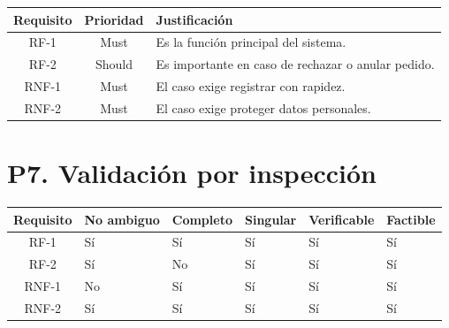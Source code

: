 \documentclass[12pt,a4paper]{article}
\begin{document}
\begin{center}
\small
\setlength{\tabcolsep}{5pt}
\begin{tabularx}{0.96\textwidth}{|c|c|X|}
\hline
\textbf{Requisito} & \textbf{Prioridad} & \textbf{Justificación} \\
\hline
RF-1 & Must & Es la función principal del sistema. \\
\hline
RF-2 & Should & Es importante en caso de rechazar o anular pedido. \\
\hline
RNF-1 & Must & El caso exige registrar con rapidez. \\
\hline
RNF-2 & Must & El caso exige proteger datos personales. \\
\hline
\end{tabularx}
\end{center}

\section*{P7. Validación por inspección}

\begin{center}
\small
\setlength{\tabcolsep}{3.5pt}
\begin{tabularx}{0.94\textwidth}{|c|Y|Y|Y|Y|Y|}
\hline
\textbf{Requisito} & \textbf{No ambiguo} & \textbf{Completo} & \textbf{Singular} & \textbf{Verificable} & \textbf{Factible} \\
\hline
RF-1 & Sí & Sí & Sí & Sí & Sí \\
\hline
RF-2 & Sí & No & Sí & Sí & Sí \\
\hline
RNF-1 & No & Sí & Sí & Sí & Sí \\
\hline
RNF-2 & Sí & Sí & Sí & Sí & Sí \\
\hline
\end{tabularx}
\end{center}
\end{document}
